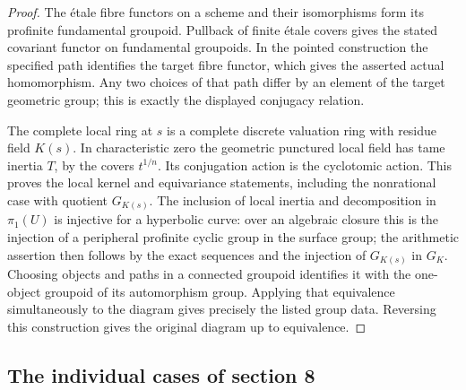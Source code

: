 \begin{proof}
The \'etale fibre functors on a scheme and their isomorphisms form its
profinite fundamental groupoid.  Pullback of finite \'etale covers
gives the stated covariant functor on fundamental groupoids.  In the
pointed construction the specified path identifies the target fibre
functor, which gives the asserted actual homomorphism.  Any two choices
of that path differ by an element of the target geometric group; this
is exactly the displayed conjugacy relation.

The complete local ring at $s$ is a complete discrete valuation ring
with residue field $K(s)$.  In characteristic zero the geometric
punctured local field has tame inertia $T$, by the covers
$t^{1/n}$.  Its conjugation action is the cyclotomic action.  This
proves the local kernel and equivariance statements, including the
nonrational case with quotient $G_{K(s)}$.  The inclusion of local
inertia and decomposition in $\pi_1(U)$ is injective for a hyperbolic
curve: over an algebraic closure this is the injection of a peripheral
profinite cyclic group in the surface group; the arithmetic assertion
then follows by the exact sequences and the injection of
$G_{K(s)}$ in $G_K$.  Choosing objects and paths in a connected
groupoid identifies it with the one-object groupoid of its
automorphism group.  Applying that equivalence simultaneously to the
diagram gives precisely the listed group data.  Reversing this
construction gives the original diagram up to equivalence.
\end{proof}

\subsection{The individual cases of section 8}

